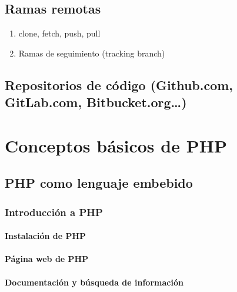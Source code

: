 \documentclass[a4paper,11pt,spanish]{sphinxmanual}
\begin{document}
\chapter{Ramas remotas}
\label{\detokenize{sistemas-de-control-de-versiones:ramas-remotas}}\begin{enumerate}
\item {} 
clone, fetch, push, pull

\item {} 
Ramas de seguimiento (tracking branch)

\end{enumerate}


\chapter{Repositorios de código (Github.com, GitLab.com, Bitbucket.org…)}
\label{\detokenize{sistemas-de-control-de-versiones:repositorios-de-codigo-github-com-gitlab-com-bitbucket-org}}

\part{Conceptos básicos de PHP}
\label{\detokenize{conceptos-basicos-de-php:conceptos-basicos-de-php}}\label{\detokenize{conceptos-basicos-de-php::doc}}

\chapter{PHP como lenguaje embebido}
\label{\detokenize{conceptos-basicos-de-php:php-como-lenguaje-embebido}}

\section{Introducción a PHP}
\label{\detokenize{conceptos-basicos-de-php:introduccion-a-php}}

\subsection{Instalación de PHP}
\label{\detokenize{conceptos-basicos-de-php:instalacion-de-php}}

\subsection{Página web de PHP}
\label{\detokenize{conceptos-basicos-de-php:pagina-web-de-php}}

\subsection{Documentación y búsqueda de información}
\label{\detokenize{conceptos-basicos-de-php:documentacion-y-busqueda-de-informacion}}
\end{document}
